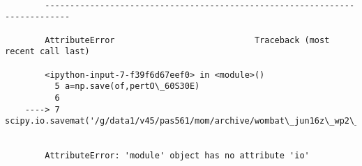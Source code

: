 \documentclass[11pt]{article}
\begin{document}
    \begin{Verbatim}[commandchars=\\\{\}]

        ---------------------------------------------------------------------------

        AttributeError                            Traceback (most recent call last)

        <ipython-input-7-f39f6d67eef0> in <module>()
          5 a=np.save(of,pertO\_60S30E)
          6 
    ----> 7 scipy.io.savemat('/g/data1/v45/pas561/mom/archive/wombat\_jun16z\_wp2\_74/pertO\_60S30E.mat',pertO\_60S30E)
    

        AttributeError: 'module' object has no attribute 'io'

    \end{Verbatim}
\end{document}
